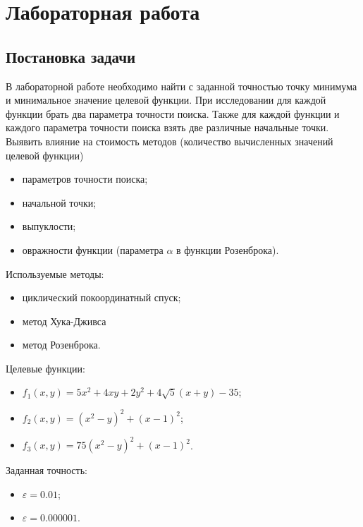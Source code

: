 \documentclass[12pt, a4paper]{article}
\title{}
\author{А.\,Д.~Егоров}
\date{2022}
\begin{document}
\maketitle

\tableofcontents



\newpage
\section{Лабораторная работа }

\subsection {Постановка задачи}

В лабораторной работе необходимо найти с заданной точностью точку минимума и минимальное значение целевой функции. При исследовании для каждой функции брать два параметра точности поиска. Также для каждой функции и каждого параметра точности поиска взять две различные начальные точки. Выявить влияние на стоимость методов (количество вычисленных значений целевой функции)
\begin{itemize}
	\item параметров точности поиска;
	\item начальной точки;
	\item выпуклости;
	\item овражности функции (параметра $\alpha$ в функции Розенброка).
\end{itemize}
Используемые методы:
\begin{itemize}
	\item циклический покоординатный спуск;
	\item метод Хука-Дживса
	\item метод Розенброка.
\end{itemize}
Целевые функции:
\begin{itemize}
	\item $f_1(x,y)=5 x^2 + 4 x y + 2 y^2 + 4 \sqrt{5} (x + y) - 35$;
	\item  $f_2(x,y)=\left(x^2-y\right)^2+(x-1)^2$;
	\item  $f_3(x,y)=75\left(x^2-y\right)^2+(x-1)^2$.
\end{itemize}
Заданная точность: 
\begin{itemize}
	\item $\varepsilon=0.01$;
	\item $\varepsilon=0.000001$.
\end{itemize}
\end{document}
